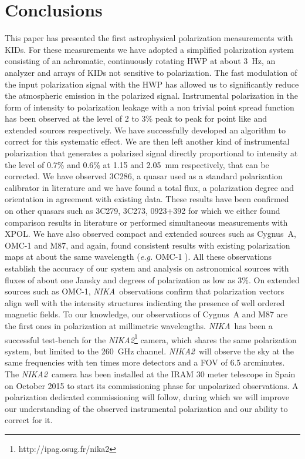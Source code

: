 \documentclass[twocolumn, traditabstract]{aa}
\newcommand{\nika}{{\it NIKA}}
\newcommand{\nikad}{{\it NIKA2}}
\begin{document}
 \section{Conclusions}\label{conclusions}
This paper has presented the first astrophysical polarization measurements with KIDs. 
For these measurements we have adopted a simplified
polarization system consisting of an achromatic, continuously rotating HWP at
about 3~Hz, an analyzer and arrays of KIDs not sensitive to polarization.  The
fast modulation of the input polarization signal with the HWP has allowed us to
significantly reduce the atmospheric emission in the polarized
signal. Instrumental polarization in the form of intensity to polarization
leakage with a non trivial point spread function has been observed at the level of 2 to 3\% peak to peak for point like
and extended sources respectively.  We have successfully developed an algorithm
to correct for this systematic effect. We are then left another kind of
instrumental polarization that generates a polarized signal directly
proportional to intensity at the level of 0.7\% and 0.6\% at 1.15 and 2.05~mm
respectively, that can be corrected.
We have observed 3C286, a quasar used as a standard polarization calibrator in
literature and we have found a total flux, a polarization degree and orientation in
agreement with existing data. These results have been confirmed on other quasars
such as 3C279, 3C273, 0923+392 for which we either found comparison results in literature or performed simultaneous measurements with XPOL. We have also observed
compact and extended sources such as Cygnus~A, OMC-1 and M87, and again, found
consistent results with existing polarization maps at about the same wavelength
({\it e.g.} OMC-1 \cite{scubapol}). All these observations establish the accuracy of
our system and analysis on astronomical sources with fluxes of about one Jansky
and degrees of polarization as low as 3\%. On extended sources such as OMC-1, \nika\ observations confirm
that polarization vectors align well with the intensity structures indicating the
presence of well ordered magnetic fields. To our knowledge, our observations of
Cygnus~A and M87 are the first ones in polarization at millimetric
wavelengths.
\nika\ has been a successful test-bench for the \nikad \footnote{http://ipag.osug.fr/nika2} camera, which shares the
same polarization system, but limited to the 260~GHz
channel. \nikad\ will observe the sky at the
same frequencies with ten times more detectors and a FOV of 6.5
arcminutes. The \nikad\ camera has been installed at the IRAM 30 meter telescope
in Spain on October 2015 to start its commissioning phase for unpolarized
observations. A polarization dedicated commissioning will follow, during which
we will improve our understanding of the observed instrumental polarization and
our ability to correct for it. 
\end{document}
